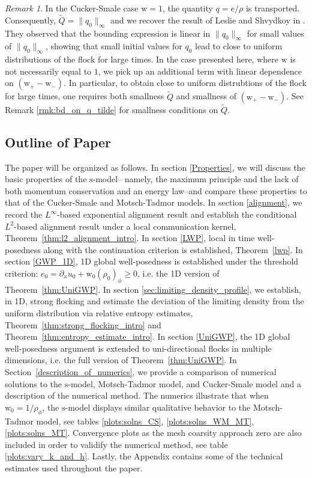 \documentclass[11pt,letterpaper]{amsart}
\theoremstyle{plain}
\theoremstyle{definition}
\theoremstyle{remark}
\newtheorem{remark}[THEOREM]{Remark}
\newcommand{\thm}[1]{Theorem~\ref{#1}}
\renewcommand{\geq}{\geqslant}
\def \st {\mathrm{s}}
\def \wt {\mathrm{w}}
\begin{document}
\begin{remark}
    In the Cucker-Smale case $\wt = 1$, the quantity $q = e/\rho$ is transported. 
    Consequently, $\tilde{Q} = \|q_0\|_{\infty}$
    and we recover the result of Leslie and Shvydkoy in \cite{LS-entropy}. 
    They observed that the bounding expression is linear in $\|q_0\|_{\infty}$ for small values 
    of $\|q_0\|_{\infty}$, showing that small initial values for $q_0$ lead to close 
    to uniform distributions of the flock for large times.  In the case presented here, 
    where $\wt$ is not necessarily equal to $1$, we pick up an additional term with 
    linear dependence on $(\wt_+ - \wt_-)$.  In particular, to obtain close to uniform 
    distrubtions of the flock for large times, one requires both smallness $\tilde{Q}$ and 
    smallness of $(\wt_+ - \wt_-)$.  See Remark \ref{rmk:bd_on_q_tilde} for smallness 
    conditions on $\tilde{Q}$. 
\end{remark}





\subsection{Outline of Paper}
The paper will be organized as follows.  
In section \ref{Properties}, we will discuss the basic properties of the $\st$-model-- namely, the maximum principle and the lack of both momentum conservation and an energy law--and compare these properties to that of the Cucker-Smale and Motsch-Tadmor models.  
In section \ref{alignment}, we record the $L^{\infty}$-based exponential alignment result and establish the conditional $L^2$-based alignment result under a local communication kernel, \thm{thm:l2_alignment_intro}. 
In section \ref{LWP}, local in time well-posedness along with the continuation criterion is established, \thm{lwp}.
In section \ref{GWP_1D}, 1D global well-posedness is established under the 
threshold criterion: $e_0 = \partial_x u_0 + \wt_0(\rho_0)_{\phi} \geq 0$, i.e. the 1D version of \thm{thm:UniGWP}.
In section \ref{sec:limiting_density_profile}, we establish, in 1D, strong flocking and estimate the deviation of the limiting density from the uniform distribution via relative entropy estimates, \thm{thm:strong_flocking_intro} and \thm{thm:entropy_estimate_intro}.
In section \ref{UniGWP}, the 1D global well-posedness argument is extended to uni-directional flocks in multiple dimensions, i.e. the full version of \thm{thm:UniGWP}.  
In Section~\ref{description_of_numerics}, we provide a comparison of numerical solutions to the $\st$-model, Motsch-Tadmor model, and Cucker-Smale model and a description of the numerical method. 
The numerics illustrate that when $\wt_0 = 1/\rho_{\phi}$, the $\st$-model displays similar qualitative behavior to the Motsch-Tadmor model, see tables \ref{plots:solns_CS}, \ref{plots:solns_WM_MT}, \ref{plots:solns_MT}.  
Convergence plots as the mesh coarsity approach zero are also included in order to validify the numerical method, see table \ref{plots:vary_k_and_h}.  Lastly, the Appendix contains some of the technical estimates used throughout the paper.
\end{document}
